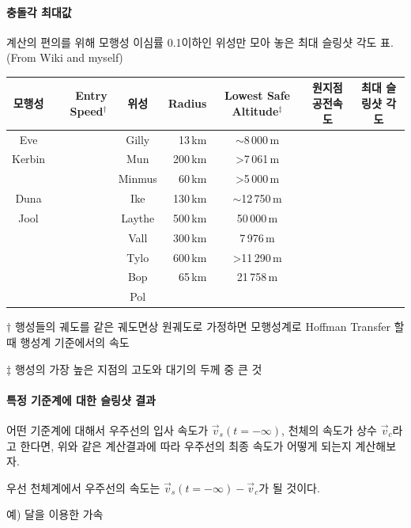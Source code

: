 \documentclass[9pt,twoside,openany]{amsbook}
\begin{document}
\paragraph{충돌각 최대값}
\begin{center}
\begin{adjustbox}{width=\textwidth}
\begin{threeparttable}
\caption{계산의 편의를 위해 모행성 이심률 0.1이하인 위성만 모아 놓은 최대 슬링샷 각도 표. (From Wiki and myself)}
\begin{tabular}{|c|r|c|r|c|c|c|}
\hline
모행성&Entry Speed$^\dagger$& 위성& Radius& Lowest Safe Altitude$^\ddagger$&원지점 공전속도 &최대 슬링샷 각도
\\\hline
Eve&&Gilly&13\,km&$\sim$8\,000\,m
\\\hline
Kerbin&&Mun&200\,km&>7\,061\,m
\\&&Minmus&60\,km&>5\,000\,m
\\\hline
Duna&&Ike&130\,km&$\sim$12\,750\,m
\\\hline
Jool&&Laythe&500\,km&50\,000\,m
\\&&Vall&300\,km&7\,976\,m
\\&&Tylo&600\,km&>11\,290\,m
\\&&Bop&65\,km&21\,758\,m
\\&&Pol
\\\hline
\end{tabular}
\begin{tablenotes}
\item[$\dagger$] 행성들의 궤도를 같은 궤도면상 원궤도로 가정하면 모행성계로 Hoffman Transfer 할 때 행성계 기준에서의 속도
\item[$\ddagger$] 행성의 가장 높은 지점의 고도와 대기의 두께 중 큰 것
\end{tablenotes}
\end{threeparttable}
\end{adjustbox}
\end{center}
\paragraph{특정 기준계에 대한 슬링샷 결과}
어떤 기준계에 대해서 우주선의 입사 속도가 $\vec{v}_s(t=-\infty)$, 천체의 속도가 상수 $\vec{v}_c$라고 한다면, 위와 같은 계산결과에 따라 우주선의 최종 속도가 어떻게 되는지 계산해보자.

우선 천체계에서 우주선의 속도는 $\vec{v}_s(t=-\infty)-\vec{v}_c$가 될 것이다.

예) 달을 이용한 가속
\end{document}
